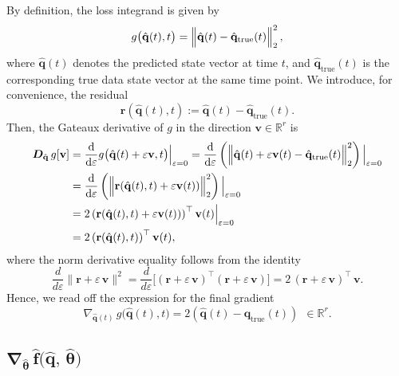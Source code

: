 By definition, the loss integrand is given by\\
$$g\bigl(\hat{\mathbf{q}}(t),t\bigr)= \Bigl\|\hat{\mathbf{q}}(t) - \hat{\mathbf{q}}_{\mathrm{true}}(t)\Bigr\|_2^2\,,$$
where $\hat{\mathbf{q}}(t)$ denotes the predicted state vector at time $t$, and $\hat{\mathbf{q}}_{\text{true}}(t)$ is the corresponding true data state vector at the same time point.
We introduce, for convenience, the residual\\
$$\mathbf{r}(\hat{\mathbf{q}}(t),t):=  \hat{\mathbf{q}}(t) - \hat{\mathbf{q}}_{\mathrm{true}}(t).$$
Then, the Gateaux derivative of $g$ in the direction $\mathbf{v}\in\mathbb{R}^r$ is\\
\begin{align*}
\label{eq:gradient_3}
\bm{D}_{\hat{\mathbf{q}}}\,g[\mathbf{v}]
&=\frac{\mathrm{d}}{\mathrm{d}\varepsilon}
g\bigl(\hat{\mathbf{q}}(t)+\varepsilon\mathbf{v},t\bigr)\Big|_{\varepsilon=0}=
\frac{\mathrm{d}}{\mathrm{d}\varepsilon}\left( \Bigl\|\hat{\mathbf{q}}(t) + \varepsilon\mathbf{v}(t) - \hat{\mathbf{q}}_{\mathrm{true}}(t)\Bigr\|_2^2\right) \Big|_{\varepsilon=0}\\
 &= \frac{\mathrm{d}}{\mathrm{d}\varepsilon}\left( \Bigl\|\mathbf{r}(\hat{\mathbf{q}}(t),t) + \varepsilon\mathbf{v}(t))\Bigr\|_2^2\right) \Big|_{\varepsilon=0}\\
 &= 2\left(\mathbf{r}(\hat{\mathbf{q}}(t),t) + \varepsilon\mathbf{v}(t))\right)^{\top}\mathbf{v}(t) \Big|_{\varepsilon=0}\\
 &= 2\left(\mathbf{r}(\hat{\mathbf{q}}(t),t)\right)^{\top}\mathbf{v}(t),
\end{align*}
where the norm derivative equality follows from the identity\\
$$\frac{d}{d\varepsilon}\|\mathbf{r} + \varepsilon\,\mathbf{v}\|^2
= \frac{d}{d\varepsilon}\bigl[(\mathbf{r} + \varepsilon\,\mathbf{v})^\top (\mathbf{r} + \varepsilon\,\mathbf{v})\bigr]= 2\,(\mathbf{r} + \varepsilon\,\mathbf{v})^\top\,\mathbf{v}.$$
Hence, we read off the expression for the final gradient\\
\begin{equation}
\label{eq:gradient_3}
\nabla_{\hat{\mathbf{q}}(t)}\,g\bigl(\hat{\mathbf{q}}(t),t\bigr) = 2\left(\hat{\mathbf{q}}(t) - \hat{\mathbf{q}}_{\mathrm{true}}(t)\right)~~\in\mathbb{R}^r.
\end{equation}

\subsection{$\bm{\nabla}_{\hat{\bm{\theta}}}\,\hat{\mathbf{f}}\bigl(\hat{\mathbf{q}},\,\hat{\bm{\theta}}\bigr)$}

